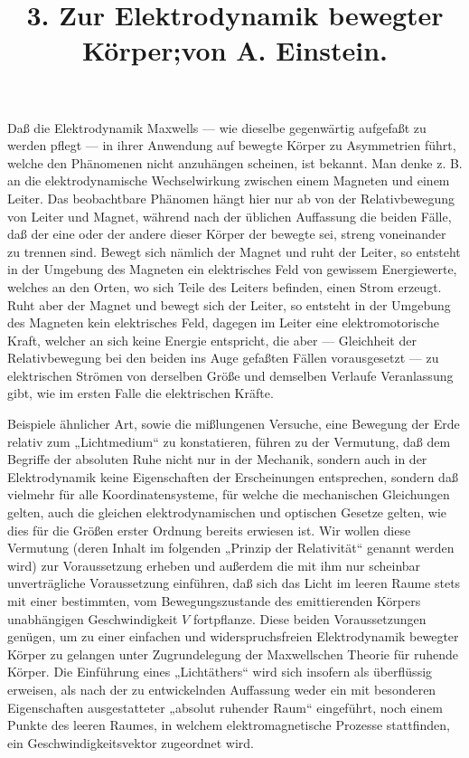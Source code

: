 \documentclass[17pt]{webarticle}       %
\title{3. Zur Elektrodynamik bewegter Körper;\newline von A. Einstein.}
\date{ }    %
\author{ }
\begin{document}

\maketitle

Daß die Elektrodynamik Maxwells — wie dieselbe gegenwärtig aufgefaßt zu werden pflegt — in ihrer Anwendung auf bewegte Körper zu Asymmetrien führt, welche den Phänomenen nicht anzuhängen scheinen, ist bekannt. Man denke z. B. an die elektrodynamische Wechselwirkung zwischen einem Magneten und einem Leiter. Das beobachtbare Phänomen hängt hier nur ab von der Relativbewegung von Leiter und Magnet, während nach der üblichen Auffassung die beiden Fälle, daß der eine oder der andere dieser Körper der bewegte sei, streng voneinander zu trennen sind. Bewegt sich nämlich der Magnet und ruht der Leiter, so entsteht in der Umgebung des Magneten ein elektrisches Feld von gewissem Energiewerte, welches an den Orten, wo sich Teile des Leiters befinden, einen Strom erzeugt. Ruht aber der Magnet und bewegt sich der Leiter, so entsteht in der Umgebung des Magneten kein elektrisches Feld, dagegen im Leiter eine elektromotorische Kraft, welcher an sich keine Energie entspricht, die aber — Gleichheit der Relativbewegung bei den beiden ins Auge gefaßten Fällen vorausgesetzt — zu elektrischen Strömen von derselben Größe und demselben Verlaufe Veranlassung gibt, wie im ersten Falle die elektrischen Kräfte.

Beispiele ähnlicher Art, sowie die mißlungenen Versuche, eine Bewegung der Erde relativ zum „Lichtmedium“ zu konstatieren, führen zu der Vermutung, daß dem Begriffe der absoluten Ruhe nicht nur in der Mechanik, sondern auch in der Elektrodynamik keine Eigenschaften der Erscheinungen entsprechen, sondern daß vielmehr für alle Koordinatensysteme, für welche die mechanischen Gleichungen gelten, auch die gleichen elektrodynamischen und optischen Gesetze gelten, wie dies für die Größen erster Ordnung bereits erwiesen ist. Wir wollen diese Vermutung (deren Inhalt im folgenden „Prinzip der Relativität“ genannt werden wird) zur Voraussetzung erheben und außerdem die mit ihm nur scheinbar unverträgliche Voraussetzung einführen, daß sich das Licht im leeren Raume stets mit einer bestimmten, vom Bewegungszustande des emittierenden Körpers unabhängigen Geschwindigkeit $V$ fortpflanze. Diese beiden Voraussetzungen genügen, um zu einer einfachen und widerspruchsfreien Elektrodynamik bewegter Körper zu gelangen unter Zugrundelegung der Maxwellschen Theorie für ruhende Körper. Die Einführung eines „Lichtäthers“ wird sich insofern als überflüssig erweisen, als nach der zu entwickelnden Auffassung weder ein mit besonderen Eigenschaften ausgestatteter „absolut ruhender Raum“ eingeführt, noch einem Punkte des leeren Raumes, in welchem elektromagnetische Prozesse stattfinden, ein Geschwindigkeitsvektor zugeordnet wird.
\end{document}
